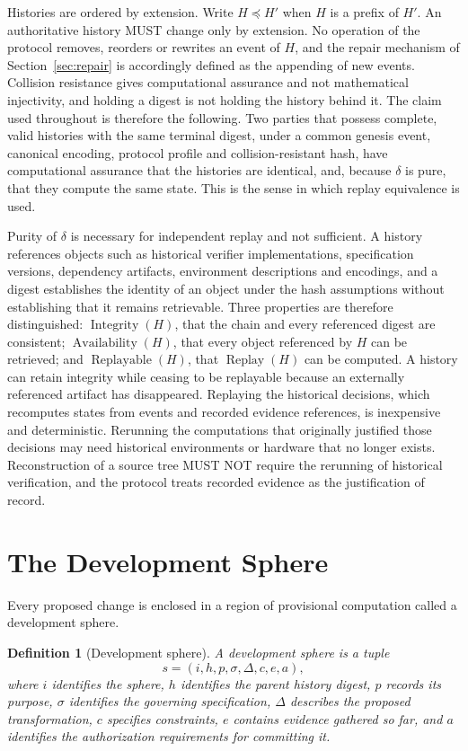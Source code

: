 \documentclass[11pt]{article}
\newtheorem{definition}{Definition}
\theoremstyle{remark}
\newcommand{\Replay}{\operatorname{Replay}}
\begin{document}
Histories are ordered by extension. Write $H\preceq H'$ when $H$ is a prefix of $H'$. An authoritative history MUST change only by extension. No operation of the protocol removes, reorders or rewrites an event of $H$, and the repair mechanism of Section~\ref{sec:repair} is accordingly defined as the appending of new events. Collision resistance gives computational assurance and not mathematical injectivity, and holding a digest is not holding the history behind it. The claim used throughout is therefore the following. Two parties that possess complete, valid histories with the same terminal digest, under a common genesis event, canonical encoding, protocol profile and collision-resistant hash, have computational assurance that the histories are identical, and, because $\delta$ is pure, that they compute the same state. This is the sense in which replay equivalence is used.

Purity of $\delta$ is necessary for independent replay and not sufficient. A history references objects such as historical verifier implementations, specification versions, dependency artifacts, environment descriptions and encodings, and a digest establishes the identity of an object under the hash assumptions without establishing that it remains retrievable. Three properties are therefore distinguished: $\operatorname{Integrity}(H)$, that the chain and every referenced digest are consistent; $\operatorname{Availability}(H)$, that every object referenced by $H$ can be retrieved; and $\operatorname{Replayable}(H)$, that $\Replay(H)$ can be computed. A history can retain integrity while ceasing to be replayable because an externally referenced artifact has disappeared. Replaying the historical decisions, which recomputes states from events and recorded evidence references, is inexpensive and deterministic. Rerunning the computations that originally justified those decisions may need historical environments or hardware that no longer exists. Reconstruction of a source tree MUST NOT require the rerunning of historical verification, and the protocol treats recorded evidence as the justification of record.

\section{The Development Sphere}\label{sec:sphere}

Every proposed change is enclosed in a region of provisional computation called a development sphere.

\begin{definition}[Development sphere]
A development sphere is a tuple
\[
s=(i,h,p,\sigma,\Delta,c,e,a),
\]
where $i$ identifies the sphere, $h$ identifies the parent history digest, $p$ records its purpose, $\sigma$ identifies the governing specification, $\Delta$ describes the proposed transformation, $c$ specifies constraints, $e$ contains evidence gathered so far, and $a$ identifies the authorization requirements for committing it.
\end{definition}
\end{document}
